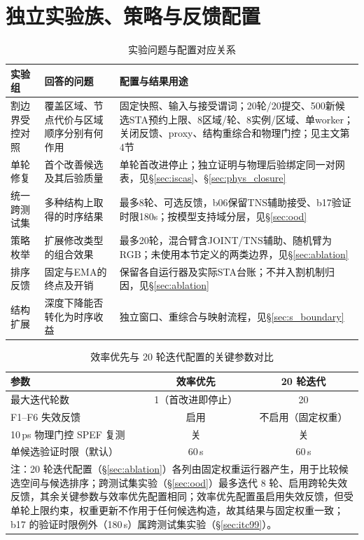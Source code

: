 \documentclass[twocolumn,10pt,fontset=windows]{ctexart}
\begin{document}
\section{独立实验族、策略与反馈配置}
\begin{table}[!t]
\centering
\caption{实验问题与配置对应关系}\label{tab:experiment_map}
\footnotesize\setlength{\tabcolsep}{4pt}
\begin{tabular}{>{\raggedright\arraybackslash}p{2.0cm}>{\raggedright\arraybackslash}p{4.8cm}>{\raggedright\arraybackslash}p{8.4cm}}
\toprule
\textbf{实验组} & \textbf{回答的问题} & \textbf{配置与结果用途} \\
\midrule
割边界受控对照 & 覆盖区域、节点代价与区域顺序分别有何作用 & 固定快照、输入与接受谓词；20轮/20提交、500新候选STA预约上限、8区域/轮、8实例/区域、单worker；关闭反馈、proxy、结构重综合和物理门控；见主文第4节 \\
单轮修复 & 首个改善候选及其后验质量 & 单轮首改进停止；独立证明与物理后验绑定同一对网表，见\S\ref{sec:iscas}、\S\ref{sec:phys_closure} \\
统一跨测试集 & 多种结构上取得的时序结果 & 最多8轮、可选反馈，b06保留TNS辅助接受、b17验证时限180s；按模型支持域分层，见\S\ref{sec:ood} \\
策略枚举 & 扩展修改类型的组合效果 & 最多20轮，混合臂含JOINT/TNS辅助、随机臂为RGB；未使用本节定义的两类边界，见\S\ref{sec:ablation} \\
排序反馈 & 固定与EMA的终点及开销 & 保留各自运行器及实际STA台账；不并入割机制归因，见\S\ref{sec:ablation} \\
结构扩展 & 深度下降能否转化为时序收益 & 独立窗口、重综合与映射流程，见\S\ref{sec:s_boundary} \\
\bottomrule
\end{tabular}
\end{table}
\begin{table}[!htb]
\centering
\caption{效率优先与 20 轮迭代配置的关键参数对比}
\label{tab:configs}
\scriptsize
\setlength{\tabcolsep}{4pt}
\begin{tabular}{lcc}
\toprule
\textbf{参数} & \textbf{效率优先} & \textbf{20 轮迭代} \\
\midrule
最大迭代轮数                    & 1（首改进即停止） & 20 \\
F1--F6 失效反馈                  & 启用 & 不启用（固定权重） \\
10\,ps 物理门控 SPEF 复测        & 关 & 关 \\
单候选验证时限（默认）           & 60\,s & 60\,s \\
\bottomrule
\multicolumn{3}{p{0.95\columnwidth}}{\footnotesize 注：20 轮迭代配置（\S\ref{sec:ablation}）各列由固定权重运行器产生，用于比较候选空间与候选排序；跨测试集实验（\S\ref{sec:ood}）最多迭代 8 轮、启用跨轮失效反馈，其余关键参数与效率优先配置相同；效率优先配置虽启用失效反馈，但受单轮上限约束，权重更新不作用于任何候选构造，故其结果与固定权重一致；b17 的验证时限例外（180\,s）属跨测试集实验（\S\ref{sec:itc99}）。}\\
\end{tabular}
\end{table}
\end{document}
